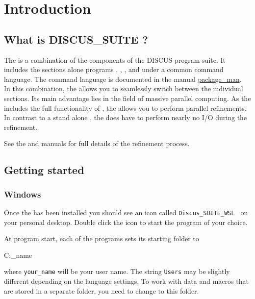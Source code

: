 
\chapter{Introduction \label{intro}}
\section{What is DISCUS\_SUITE ?}

The \Suite is a combination of the components of the DISCUS program 
suite. It includes the sections alone programs 
\href{./discus\_man.pdf}\discus, 
\href{./diffev\_man.pdf}\diffev, 
\href{./refine\_man.pdf}, and
\href{./kuplot\_man.pdf}\Kuplot under a common  command language. 
The command language is documented in the manual 
\href{./package\_man.pdf}{package\_man}.\\
In this combination, the 
\Suite allows you to seamlessly switch between the individual
sections. Its main advantage lies in the field of massive parallel 
computing. As the \Suite includes the full functionality of 
\diffev, the \Suite allows you to perform parallel refinements.
In contrast to a stand alone \diffev, the \Suite does have to
perform nearly no I/O during the refinement.

See the \Diffev and \Refine manuals for full details of the 
refinement process.


\section{Getting started \label{intro-get}}

\subsection{Windows}

Once the \Suite has been installed you should see an icon called
{\tt Discus\_SUITE\_WSL\ }
on your personal desktop. Double click the icon to start
the program of your choice.

At program start, each of the programs sets its starting folder to\\
\begin{MacVerbatim}
   C:\Users\your_name
\end{MacVerbatim}
where {\tt your\_name} will be your user name. The string {\tt Users}
may be slightly different depending on the language settings.
To work with data and macros that are stored in a separate folder,
you need to change to this folder.

